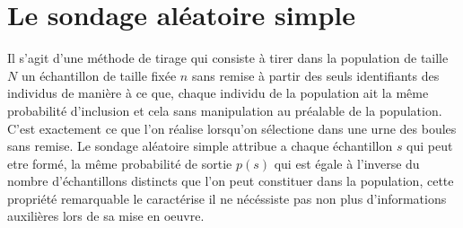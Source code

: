 \documentclass[a4paper]{article}
\begin{document}
\part{Le sondage aléatoire simple}
Il s'agit d'une méthode de tirage qui consiste à tirer dans la population de taille $N$ un échantillon de taille fixée  $n$ sans remise à partir des
seuls identifiants des individus de manière à ce que, chaque individu de la population ait la même probabilité d'inclusion et cela sans manipulation
au préalable de la population. C'est exactement ce que l'on réalise lorsqu'on sélectione dans une urne des boules sans remise. Le sondage aléatoire
simple attribue a chaque échantillon $s$ qui peut etre formé, la même probabilité de sortie $p(s)$ qui est égale à l'inverse du nombre d'échantillons
distincts que l'on peut constituer dans la population, cette propriété remarquable le caractérise il ne nécéssiste pas non plus d'informations
auxilières lors de sa mise en oeuvre.
\end{document}

